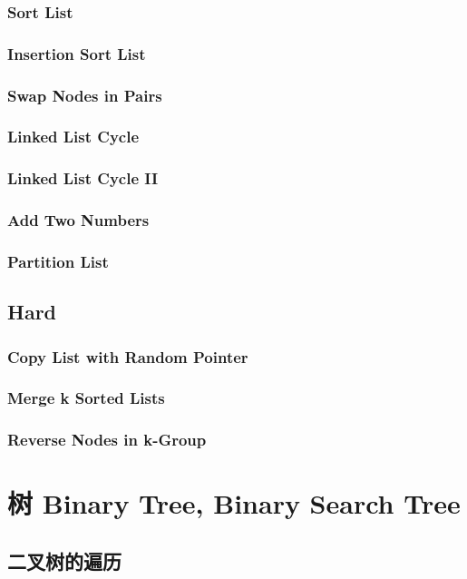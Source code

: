 \documentclass[11pt]{book}
\begin{document}
\subsection{Sort List}
\label{sec-3-2-6}
\subsection{Insertion Sort List}
\label{sec-3-2-7}
\subsection{Swap Nodes in Pairs}
\label{sec-3-2-8}
\subsection{Linked List Cycle}
\label{sec-3-2-9}
\subsection{Linked List Cycle II}
\label{sec-3-2-10}
\subsection{Add Two Numbers}
\label{sec-3-2-11}
\subsection{Partition List}
\label{sec-3-2-12}
\section{Hard}
\label{sec-3-3}
\subsection{Copy List with Random Pointer}
\label{sec-3-3-1}
\subsection{Merge k Sorted Lists}
\label{sec-3-3-2}
\subsection{Reverse Nodes in k-Group}
\label{sec-3-3-3}

\chapter{树 Binary Tree, Binary Search Tree}
\label{sec-4}
\section{二叉树的遍历}
\label{sec-4-1}
\end{document}
